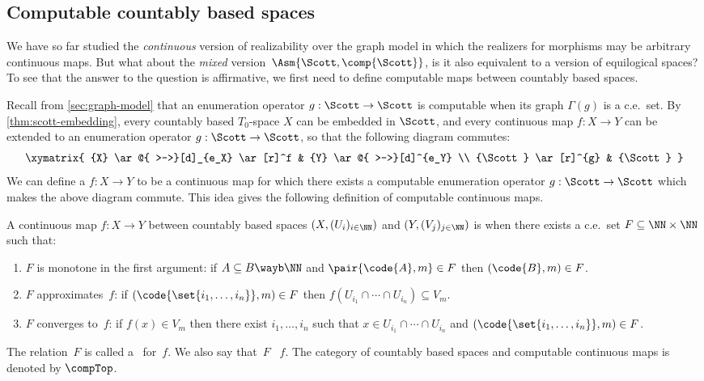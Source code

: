 \subsection{Computable countably based spaces}
\label{sec:computable-countably based-spaces}

We have so far studied the \emph{continuous} version of realizability
over the graph model in which the realizers for morphisms may be
arbitrary continuous maps. But what about the \emph{mixed}
version~$\Asm{\Scott, \comp{\Scott}}$, is it also equivalent to a
version of equilogical spaces? To see that the answer to the question
is affirmative, we first need to define computable maps between
countably based spaces.

Recall from \cref{sec:graph-model} that an enumeration operator
$g: \Scott \to \Scott$ is computable when its graph $\Gamma(g)$ is a
c.e.~set. By \cref{thm:scott-embedding}, every
countably based $T_0$-space $X$ can be embedded in $\Scott$, and every
continuous map $f: X \to Y$ can be extended to an enumeration operator
$g: \Scott \to \Scott$, so that the following diagram commutes:
%
\begin{equation*}
  \xymatrix{
    {X}   \ar@{ >->}[d]_{e_X} \ar[r]^f  &
    {Y} \ar@{ >->}[d]^{e_Y} \\
    {\Scott} \ar[r]^{g} &
    {\Scott}
  }
\end{equation*}
%
We can define a  $f: X \to Y$ to be a
continuous map for which there exists a computable enumeration
operator $g: \Scott \to \Scott$ which makes the above diagram commute.
This idea gives the following definition of computable continuous
maps.

\begin{definition}
  \label{def:computable-map}%
  A continuous map $f : X \to Y$ between countably based spaces $(X,
  (U_i)_{i \in \NN})$ and $(Y, (V_j)_{j \in \NN})$ is
   when there exists a c.e.~set $F \subseteq \NN
  \times \NN$ such that:
  \begin{enumerate}
  \item
    $F$ is monotone in the first argument: if $A \subseteq B \wayb
    \NN$ and $\pair{\code{A}, m} \in F$ then $(\code{B}, m) \in
    F$.
  \item
    $F$ approximates~$f$: if $(\code{\set{i_1, \ldots, i_n}}, m) \in
    F$ then $f(U_{i_1} \cap \cdots \cap U_{i_n}) \subseteq V_m$.
  \item
    $F$ converges to~$f$: if $f(x) \in V_m$ then there exist $i_1,
    \ldots, i_n$ such that $x \in U_{i_1} \cap \cdots \cap U_{i_n}$
    and $(\code{\set{i_1, \ldots, i_n}}, m) \in F$.
  \end{enumerate}
  The relation~$F$ is called a~ for~$f$. We also
  say that~$F$ ~$f$.
  The category of countably based spaces and computable continuous
  maps is denoted by $\compTop$.
\end{definition}

